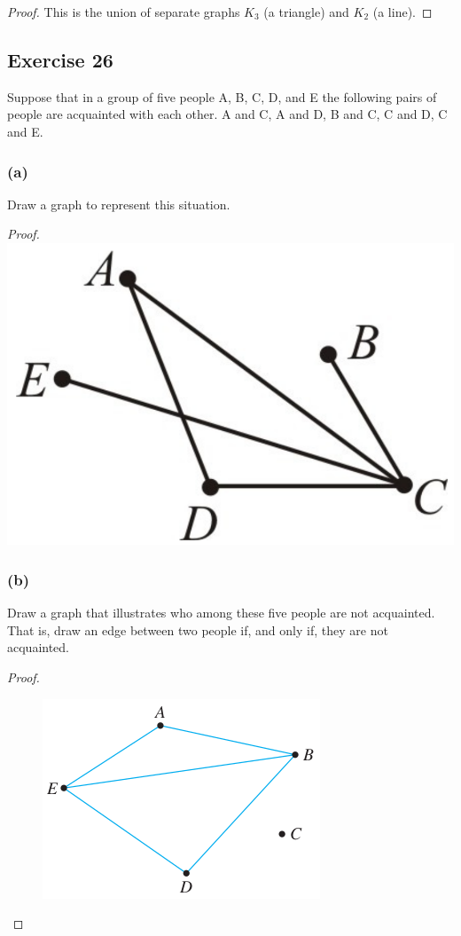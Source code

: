\documentclass[14pt]{extarticle}
\begin{document}
\begin{proof}
This is the union of separate graphs \(K_3\) (a triangle) and \(K_2\) (a line).
\end{proof}

\subsection{Exercise 26}
Suppose that in a group of five people A, B, C, D, and E the following pairs of people are acquainted with each other. A 
and C, A and D, B and C, C and D, C and E.

\subsubsection{(a)}
Draw a graph to represent this situation.

{\it Proof.}
\includegraphics[scale=0.15]{../images/10.1.26.a.png}

\subsubsection{(b)}
Draw a graph that illustrates who among these five people are not acquainted. That is, draw an edge between two people if, 
and only if, they are not acquainted.

\begin{proof}
\begin{figure}[ht!]
\centering
\includegraphics[scale=0.4]{../images/10.1.26.b.png}
\end{figure}
\end{proof}
\end{document}
